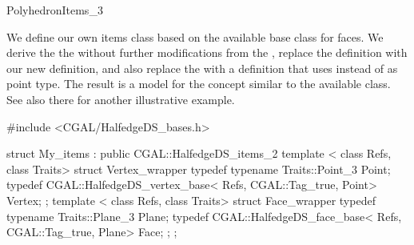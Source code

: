 \begin{ccRefConcept}{PolyhedronItems_3}
\ccExample

We define our own items class based on the available
 base class for faces. We derive the
the  without further modifications from the
, replace the 
definition with our new definition, and also replace the
 with a definition that uses  instead
of  as point type. The result is a model for the
 concept similar to the available
 class. See also there for another
illustrative example.

\begin{ccExampleCode}
#include <CGAL/HalfedgeDS_bases.h>

struct My_items : public CGAL::HalfedgeDS_items_2 {
    template < class Refs, class Traits>
    struct Vertex_wrapper {
        typedef typename Traits::Point_3 Point;
        typedef CGAL::HalfedgeDS_vertex_base< Refs, CGAL::Tag_true, Point> Vertex;
    };
    template < class Refs, class Traits>
    struct Face_wrapper {
        typedef typename Traits::Plane_3 Plane;
        typedef CGAL::HalfedgeDS_face_base< Refs, CGAL::Tag_true, Plane>   Face;
    };
};
\end{ccExampleCode}

\end{ccRefConcept}

\ccRefPageEnd

